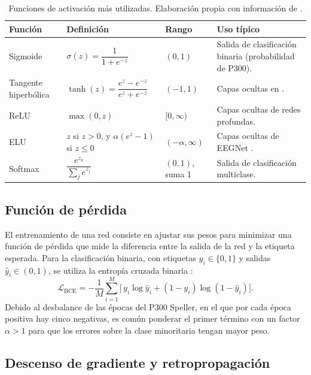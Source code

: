 \begin{table}[htbp]
\centering
\small
\renewcommand{\arraystretch}{1.8}
\begin{tabularx}{\textwidth}{|L{2.6cm}|L{4.3cm}|L{1.6cm}|Y|}
\hline
\textbf{Función} & \textbf{Definición} & \textbf{Rango} & \textbf{Uso típico} \\ \hline
Sigmoide & $\sigma(z) = \dfrac{1}{1+e^{-z}}$ & $(0,1)$ & Salida de clasificación binaria (probabilidad de P300). \\[8pt] \hline
Tangente hiperbólica & $\tanh(z) = \dfrac{e^{z}-e^{-z}}{e^{z}+e^{-z}}$ & $(-1,1)$ & Capas ocultas en \cite{cecotti2011,alvarado2021}. \\[8pt] \hline
ReLU & $\max(0,z)$ & $[0,\infty)$ & Capas ocultas de redes profundas. \\[4pt] \hline
ELU & $z$ si $z>0$, y $\alpha(e^{z}-1)$ si $z\le0$ & $(-\alpha,\infty)$ & Capas ocultas de EEGNet \cite{lawhern2018}. \\[4pt] \hline
Softmax & $\dfrac{e^{z_k}}{\sum_{j} e^{z_j}}$ & $(0,1)$, suma 1 & Salida de clasificación multiclase. \\ \hline
\end{tabularx}
\caption{Funciones de activación más utilizadas. Elaboración propia con información de \cite{goodfellow2016,aggarwal2018}.}
\label{tab:activaciones}
\end{table}

\subsection{Función de pérdida}

El entrenamiento de una red consiste en ajustar sus pesos para minimizar una función de pérdida
que mide la diferencia entre la salida de la red y la etiqueta esperada. Para la clasificación
binaria, con etiquetas $y_i\in\{0,1\}$ y salidas $\hat{y}_i\in(0,1)$, se utiliza la entropía
cruzada binaria \cite{goodfellow2016}:
\begin{equation}
\mathcal{L}_{\text{BCE}} = -\frac{1}{M}\sum_{i=1}^{M}\Big[\,y_i\log\hat{y}_i + (1-y_i)\log(1-\hat{y}_i)\Big].
\label{eq:bce}
\end{equation}
Debido al desbalance de las épocas del P300 Speller, en el que por cada época positiva hay cinco
negativas, es común ponderar el primer término con un factor $\alpha>1$ para que los errores sobre
la clase minoritaria tengan mayor peso.

\subsection{Descenso de gradiente y retropropagación}

